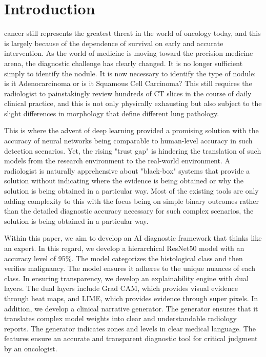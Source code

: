 \documentclass[conference]{IEEEtran}
\begin{document}
\section{Introduction}
 cancer still represents the greatest threat in the world of oncology today, and this is largely because of the dependence of survival on early and accurate intervention. As the world of medicine is moving toward the precision medicine arena, the diagnostic challenge has clearly changed. It is no longer sufficient simply to identify the nodule. It is now necessary to identify the type of nodule: is it Adenocarcinoma or is it Squamous Cell Carcinoma? This still requires the radiologist to painstakingly review hundreds of CT slices in the course of daily clinical practice, and this is not only physically exhausting but also subject to the slight differences in morphology that define different lung pathology. \par
This is where the advent of deep learning provided a promising solution with the accuracy of neural networks being comparable to human-level accuracy in such detection scenarios. Yet, the rising "trust gap" is hindering the translation of such models from the research environment to the real-world environment. A radiologist is naturally apprehensive about "black-box" systems that provide a solution without indicating where the evidence is being obtained or why the solution is being obtained in a particular way. Most of the existing tools are only adding complexity to this with the focus being on simple binary outcomes rather than the detailed diagnostic accuracy necessary for such complex scenarios, the solution is being obtained in a particular way. \par
Within this paper, we aim to develop an AI diagnostic framework that thinks like an expert. In this regard, we develop a hierarchical ResNet50 model with an accuracy level of 95\%. The model categorizes the histological class and then verifies malignancy. The model ensures it adheres to the unique nuances of each class. In ensuring transparency, we develop an explainability engine with dual layers. The dual layers include Grad CAM, which provides visual evidence through heat maps, and LIME, which provides evidence through super pixels. In addition, we develop a clinical narrative generator. The generator ensures that it translates complex model weights into clear and understandable radiology reports. The generator indicates zones and levels in clear medical language. The features ensure an accurate and transparent diagnostic tool for critical judgment by an oncologist.
\end{document}
